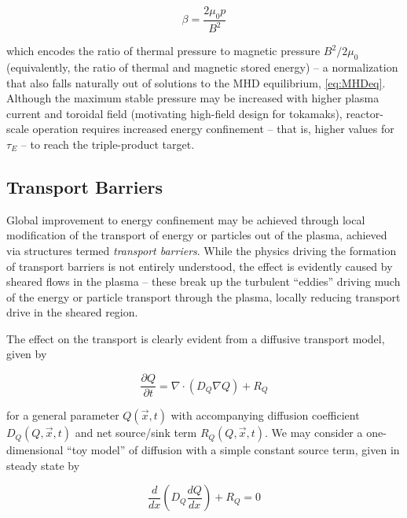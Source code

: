 \begin{equation}\label{eq:beta}
 \beta = \frac{2 \mu_0 p}{B^2}
\end{equation}

\noindent which encodes the ratio of thermal pressure to magnetic pressure $B^2/2\mu_0$ (equivalently, the ratio of thermal and magnetic stored energy) -- a normalization that also falls naturally out of solutions to the MHD equilibrium, \cref{eq:MHDeq}.  Although the maximum stable pressure may be increased with higher plasma current and toroidal field (motivating high-field design for tokamaks), reactor-scale operation requires increased energy confinement -- that is, higher values for $\tau_E$ -- to reach the triple-product target.

\subsection{Transport Barriers}\label{subsec:intro_barriers}

Global improvement to energy confinement may be achieved through local modification of the transport of energy or particles out of the plasma, achieved via structures termed \emph{transport barriers}.  While the physics driving the formation of transport barriers is not entirely understood, the effect is evidently caused by sheared flows in the plasma -- these break up the turbulent ``eddies'' driving much of the energy or particle transport through the plasma, locally reducing transport drive in the sheared region.  

The effect on the transport is clearly evident from a diffusive transport model, given by

\begin{equation}\label{eq:diffusion}
 \frac{\partial Q}{\partial t} = \nabla \cdot \left( D_Q \nabla Q \right) + R_Q
\end{equation}

\noindent for a general parameter $Q(\vec{x},t)$ with accompanying diffusion coefficient $D_Q(Q,\vec{x},t)$ and net source/sink term $R_Q(Q,\vec{x},t)$.  We may consider a one-dimensional ``toy model'' of diffusion with a simple constant source term, given in steady state by

\begin{equation}\label{eq:diffusion2}
 \frac{d}{dx} \left( D_Q \frac{dQ}{dx} \right) + R_Q = 0
\end{equation}

